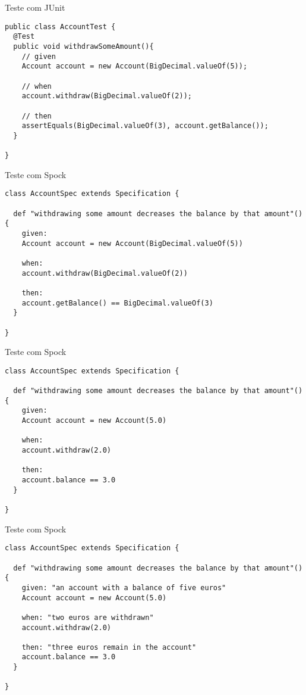\documentclass{beamer}
\begin{document}
\begin{frame}[fragile]{Teste com JUnit}
 \begin{verbatim}
public class AccountTest {
  @Test
  public void withdrawSomeAmount(){
    // given
    Account account = new Account(BigDecimal.valueOf(5));
    
    // when
    account.withdraw(BigDecimal.valueOf(2));
    
    // then
    assertEquals(BigDecimal.valueOf(3), account.getBalance());
  }
  
}
  \end{verbatim}
\end{frame}

\begin{frame}[fragile]{Teste com Spock}
 \begin{verbatim}
class AccountSpec extends Specification {
  
  def "withdrawing some amount decreases the balance by that amount"(){
    given:
    Account account = new Account(BigDecimal.valueOf(5))
    
    when:
    account.withdraw(BigDecimal.valueOf(2))
    
    then:
    account.getBalance() == BigDecimal.valueOf(3) 
  }
  
}
  \end{verbatim}
\end{frame}

\begin{frame}[fragile]{Teste com Spock}
 \begin{verbatim}
class AccountSpec extends Specification {
  
  def "withdrawing some amount decreases the balance by that amount"(){
    given:
    Account account = new Account(5.0)
    
    when:
    account.withdraw(2.0)
    
    then:
    account.balance == 3.0
  }
  
}
  \end{verbatim}
\end{frame}

\begin{frame}[fragile]{Teste com Spock}
 \begin{verbatim}
class AccountSpec extends Specification {
  
  def "withdrawing some amount decreases the balance by that amount"(){
    given: "an account with a balance of five euros"
    Account account = new Account(5.0)
    
    when: "two euros are withdrawn"
    account.withdraw(2.0)
    
    then: "three euros remain in the account"
    account.balance == 3.0
  }
  
}
  \end{verbatim}
\end{frame}
\end{document}
